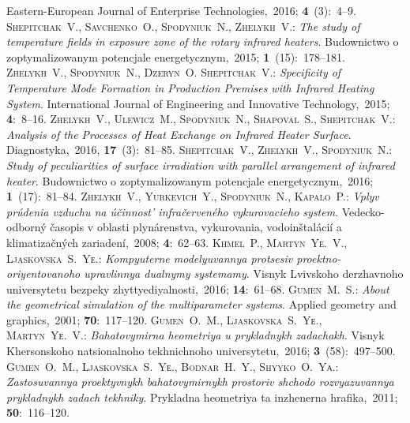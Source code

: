 \documentclass[12pt,twoside]{article}
\begin{document}
\begin{JGGarticle}
\begin{thebibliography}{99}
				Eastern-European Journal of Enterprise Technologies,~2016; \textbf{4}~(3):~4--9.
				{\scshape Shepitchak~V., Savchenko~O., Spodyniuk~N., Zhelykh~V.}:
				{\itshape The study of temperature fields in exposure zone of the rotary infrared heaters}.
				Budownictwo o zoptymalizowanym potencjale energetycznym,~2015; \textbf{1}~(15):~178--181.
				{\scshape Zhelykh~V., Spodyniuk~N., Dzeryn~O. Shepitchak~V.}:
				{\itshape Specificity of Temperature Mode Formation in Production Premises with Infrared Heating System}.
				International Journal of Engineering and Innovative Technology,~2015; \textbf{4}:~8--16.
				{\scshape Zhelykh~V., Ulewicz~M., Spodyniuk~N., Shapoval~S., Shepitchak~V.}:
				{\itshape Analysis of the Processes of Heat Exchange on Infrared Heater Surface}.
				Diagnostyka,~2016, \textbf{17}~(3):~81--85.
				{\scshape Shepitchak~V., Zhelykh~V., Spodyniuk~N.}:
				{\itshape Study of peculiarities of surface irradiation with parallel arrangement of infrared heater}.
				Budownictwo o zoptymalizowanym potencjale energetycznym,~2016; \textbf{1}~(17):~81--84.
				{\scshape Zhelykh~V., Yurkevich~Y., Spodyniuk~N., Kapalo~P.}:
				{\itshape Vplyv pr\'udenia vzduchu na \'u\v cinnost' infra\v cerven\'eho vykurovacieho system}.
				Vedecko-odborn\'y \v casopis v oblasti plyn\'arenstva, vykurovania, vodoin\v stal\'aci\'i a klimatiza\v cn\'ych zariaden\'i,~2008; \textbf{4}:~62--63.
				{\scshape Khmel~P., Martyn~Yе.~V., Ljaskovska~S.~Yе.}:
				{\itshape Kompyuterne modelyuvannya protsesiv proektno-oriyentovanoho upravlinnya dualnymy systemamy}.
				Visnyk Lvivskoho derzhavnoho universytetu bezpeky zhyttyediyalnosti,~2016; \textbf{14}:~61--68.
				{\scshape Gumen~M.~S.}:
				{\itshape About the geometrical simulation of the multiparameter systems}.
				Applied geometry and graphics,~2001; \textbf{70}:~117--120.
				{\scshape Gumen~O.~M., Ljaskovska~S.~Yе., Martyn~Yе.~V.}:
				{\itshape Bahatovymirna heometriya u prykladnykh zadachakh}.
				Visnyk Khersonskoho natsionalnoho tekhnichnoho universytetu,~2016; \textbf{3}~(58):~497--500.
				{\scshape Gumen~O.~M., Ljaskovska~S.~Yе., Bodnar~H.~Y., Shyyko~O.~Yа.}:
				{\itshape Zastosuvannya proektyvnykh bahatovymirnykh prostoriv shchodo rozvyazuvannya prykladnykh zadach tekhniky}.
				Prykladna heometriya ta inzhenerna hrafika,~2011; \textbf{50}:~116--120.

\end{thebibliography}
\end{JGGarticle}
\end{document}
